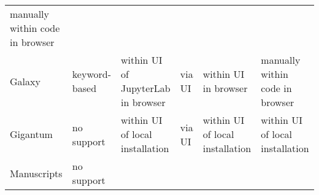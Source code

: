 \documentclass[onecolumn]{article}
\begin{document}
\begin{longtable}[]{@{}llllll@{}}
\begin{minipage}[t]{0.15\columnwidth}
manually within code in browser\strut
\end{minipage}\tabularnewline
\begin{minipage}[t]{0.12\columnwidth}\raggedright
Galaxy\strut
\end{minipage} & \begin{minipage}[t]{0.12\columnwidth}\raggedright
keyword-based\strut
\end{minipage} & \begin{minipage}[t]{0.18\columnwidth}\raggedright
within UI of JupyterLab in browser\strut
\end{minipage} & \begin{minipage}[t]{0.09\columnwidth}\raggedright
via UI\strut
\end{minipage} & \begin{minipage}[t]{0.18\columnwidth}\raggedright
within UI in browser\strut
\end{minipage} & \begin{minipage}[t]{0.15\columnwidth}\raggedright
manually within code in browser\strut
\end{minipage}\tabularnewline
\begin{minipage}[t]{0.12\columnwidth}\raggedright
Gigantum\strut
\end{minipage} & \begin{minipage}[t]{0.12\columnwidth}\raggedright
no support\strut
\end{minipage} & \begin{minipage}[t]{0.18\columnwidth}\raggedright
within UI of local installation\strut
\end{minipage} & \begin{minipage}[t]{0.09\columnwidth}\raggedright
via UI\strut
\end{minipage} & \begin{minipage}[t]{0.18\columnwidth}\raggedright
within UI of local installation\strut
\end{minipage} & \begin{minipage}[t]{0.15\columnwidth}\raggedright
within UI of local installation\strut
\end{minipage}\tabularnewline
\begin{minipage}[t]{0.12\columnwidth}\raggedright
Manuscripts\strut
\end{minipage} & \begin{minipage}[t]{0.12\columnwidth}\raggedright
no support\strut
\end{minipage} & \begin{minipage}[t]{0.18\columnwidth}\raggedright

\end{minipage}
\end{longtable}
\end{document}
